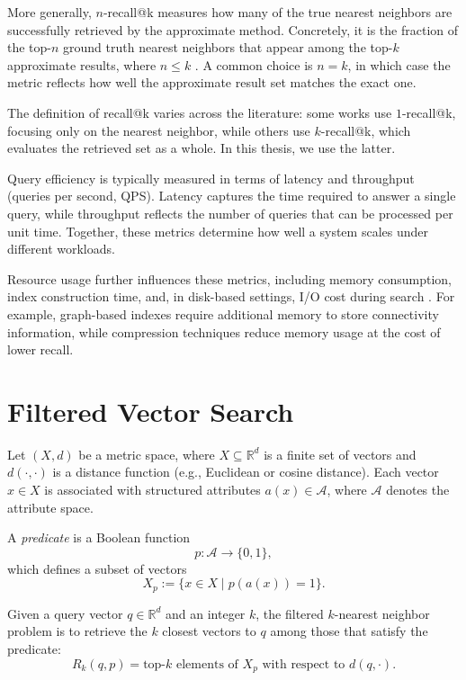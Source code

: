 More generally, $n$-recall@k measures how many of the true nearest neighbors are successfully retrieved by the approximate method. Concretely, it is the fraction of the top-$n$ ground truth nearest neighbors that appear among the top-$k$ approximate results, where $n \leq k$ \cite{douze2025faisslibrary}. A common choice is $n = k$, in which case the metric reflects how well the approximate result set matches the exact one.

The definition of recall@k varies across the literature: some works use $1$-recall@k, focusing only on the nearest neighbor, while others use $k$-recall@k, which evaluates the retrieved set as a whole. In this thesis, we use the latter.

Query efficiency is typically measured in terms of latency and throughput (queries per second, QPS). Latency captures the time required to answer a single query, while throughput reflects the number of queries that can be processed per unit time. Together, these metrics determine how well a system scales under different workloads.

Resource usage further influences these metrics, including memory consumption, index construction time, and, in disk-based settings, I/O cost during search \cite{douze2025faisslibrary}. For example, graph-based indexes require additional memory to store connectivity information, while compression techniques reduce memory usage at the cost of lower recall.

\section{Filtered Vector Search}\label{sec:filtered-vector-search}

Let $(X, d)$ be a metric space, where $X \subseteq \mathbb{R}^d$ is a finite set of vectors and $d(\cdot,\cdot)$ is a distance function (e.g., Euclidean or cosine distance). Each vector $x \in X$ is associated with structured attributes $a(x) \in \mathcal{A}$, where $\mathcal{A}$ denotes the attribute space.

A \emph{predicate} is a Boolean function
\[
p : \mathcal{A} \rightarrow \{0,1\},
\]
which defines a subset of vectors
\[
X_p := \{ x \in X \mid p(a(x)) = 1 \}.
\]

Given a query vector $q \in \mathbb{R}^d$ and an integer $k$, the filtered $k$-nearest neighbor problem is to retrieve the $k$ closest vectors to $q$ among those that satisfy the predicate:
\[
R_k(q, p) = \text{top-}k \text{ elements of } X_p \text{ with respect to } d(q,\cdot).
\]

